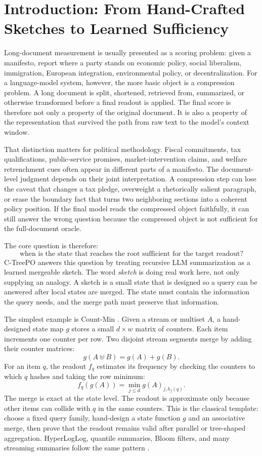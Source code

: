 \section{Introduction: From Hand-Crafted Sketches to Learned Sufficiency}\label{sec:min-introduction}

Long-document measurement is usually presented as a scoring problem: given a
manifesto, report where a party stands on economic policy, social liberalism,
immigration, European integration, environmental policy, or decentralization.
For a language-model system, however, the more basic object is a compression
problem. A long document is split, shortened, retrieved from, summarized, or
otherwise transformed before a final readout is applied. The final score is
therefore not only a property of the original document. It is also a property
of the representation that survived the path from raw text to the model's
context window.

That distinction matters for political methodology. Fiscal commitments, tax
qualifications, public-service promises, market-intervention claims, and
welfare retrenchment cues often appear in different parts of a manifesto. The
document-level judgment depends on their joint interpretation. A compression
step can lose the caveat that changes a tax pledge, overweight a rhetorically
salient paragraph, or erase the boundary fact that turns two neighboring
sections into a coherent policy position. If the final model reads the
compressed object faithfully, it can still answer the wrong question because
the compressed object is not sufficient for the full-document oracle.

The core question is therefore:
\[
  \text{when is the state that reaches the root sufficient for the target
  readout?}
\]
C-TreePO answers this question by treating recursive LLM summarization as a
learned mergeable sketch. The word \emph{sketch} is doing real work here, not
only supplying an analogy. A sketch is a small state that is designed so a
query can be answered after local states are merged. The state must contain
the information the query needs, and the merge path must preserve that
information.

The simplest example is Count-Min \citep{CormodeMuthukrishnan2005}. Given a
stream or multiset $A$, a hand-designed state map $g$ stores a small
$d\times w$ matrix of counters. Each item increments one counter per row.
Two disjoint stream segments merge by adding their counter matrices:
\[
  g(A\uplus B)=g(A)+g(B).
\]
For an item $q$, the readout $f_q$ estimates its frequency by checking the
counters to which $q$ hashes and taking the row minimum:
\[
  f_q(g(A))=\min_{j\le d} g(A)_{j,h_j(q)}.
\]
The merge is exact at the state level. The readout is approximate only because
other items can collide with $q$ in the same counters. This is the classical
template: choose a fixed query family, hand-design a state function $g$ and an
associative merge, then prove that the readout remains valid after parallel or
tree-shaped aggregation. HyperLogLog, quantile summaries, Bloom filters, and
many streaming summaries follow the same pattern
\citep{FlajoletEtAl2007,Agarwal2013MergeableTODS,BoykinEtAl2014Summingbird}.

